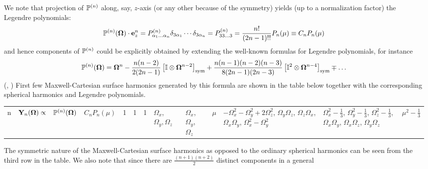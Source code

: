 We note that projection of $\mathbb{P}^{(n)}$ along, say, $z$-axis (or any other because of the symmetry) yields (up to a
normalization factor) the Legendre polynomials:
\begin{equation}\label{eq:leg}
  \mathbb{P}^{(n)}(\mathbf{\Omega})\cdot\mathbf{e}_z^n = P^{(n)}_{\alpha_1\ldots\alpha_n}\delta_{3\alpha_1}\cdots\delta_{3\alpha_n} = P^{(n)}_{33\ldots3} = \frac{n!}{(2n-1)!!}P_n(\mu) \equiv C_n P_n(\mu)
\end{equation}
and hence components of $\mathbb{P}^{(n)}$ could be explicitly obtained by extending the well-known formulas for Legendre 
polynomials, for instance
\begin{equation}\label{eq:conn1}
  \mathbb{P}^{(n)}(\mathbf{\Omega}) = \mathbf{\Omega}^n - \frac{n(n-2)}{2(2n-1)}\left[\mathbb{I}\otimes\mathbf{\Omega}^{n-2}\right]_{\mbox{\scriptsize sym}} + \frac{n(n-1)(n-2)(n-3)}{8(2n-1)(2n-3)}\left[\mathbb{I}^2\otimes\mathbf{\Omega}^{n-4}\right]_{\mbox{\scriptsize sym}}\mp\ldots
\end{equation}
(\cite[Chap. VI]{Byerly}, \cite{Johnston1})
First few Maxwell-Cartesian surface harmonics generated by this formula are shown in the table below together with the 
corresponding spherical harmonics and Legendre polynomials.
\begin{center}
	\begin{tabular}{|A|B|C|D|}
	  \hline
		n & $\mathbf{Y}_{n}(\mathbf{\Omega})\propto$ & $\mathbb{P}^{(n)}(\mathbf{\Omega})$ & $C_n P_n(\mu)$  & 1 & 1 & 1 & $\Omega_x$, $\Omega_y, \Omega_z$ & $\Omega_x$, $\Omega_y$, $\Omega_z$ & $\mu$  & $-\Omega_x^2-\Omega_y^2 + 2\Omega_z^2$, 
		    $\Omega_y\Omega_z$, 
		    $\Omega_z\Omega_x$,
		    $\Omega_x\Omega_y$,
		    $\Omega_x^2 - \Omega_y^2$ & $\Omega_x^2-\tfrac13$, 
		                                $\Omega_y^2-\tfrac13$, 
		                                $\Omega_z^2-\tfrac13$, 
		                                $\Omega_x\Omega_y$, 
		                                $\Omega_x\Omega_z$, 
		                                $\Omega_y\Omega_z$ & $\mu^2 - \tfrac13$ \nl
	\end{tabular}
	\label{tab:harmonics}
\end{center}
 The symmetric nature of the Maxwell-Cartesian surface harmonics as opposed to the ordinary spherical harmonics can be
 seen from the third row in the table. We also note that since there are $\frac{(n+1)(n+2)}{2}$ distinct components in a general 
